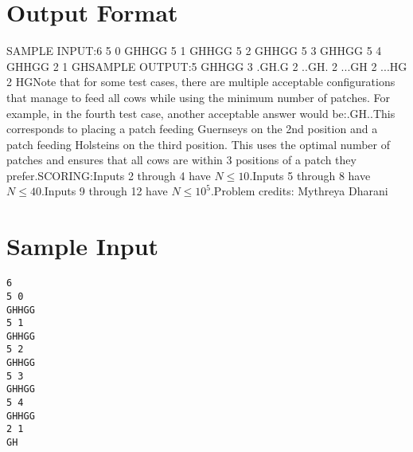 \documentclass[12pt]{article}
\begin{document}
\section*{Output Format}
SAMPLE INPUT:6
5 0
GHHGG
5 1
GHHGG
5 2
GHHGG
5 3
GHHGG
5 4
GHHGG
2 1
GHSAMPLE OUTPUT:5
GHHGG
3
.GH.G
2
..GH.
2
...GH
2
...HG
2
HGNote that for some test cases, there are multiple acceptable configurations that
manage to feed all cows while using the minimum number of patches. For example,
in the fourth test case, another acceptable answer would be:.GH..This corresponds to placing a patch feeding Guernseys on the 2nd position and a
patch feeding Holsteins on the third position. This uses the optimal number of
patches and ensures that all cows are within 3 positions of a patch they prefer.SCORING:Inputs 2 through 4 have $N \le 10$.Inputs 5 through 8 have $N \le 40$.Inputs 9 through 12 have $N \le 10^5$.Problem credits: Mythreya Dharani

\section*{Sample Input}
\begin{verbatim}
6
5 0
GHHGG
5 1
GHHGG
5 2
GHHGG
5 3
GHHGG
5 4
GHHGG
2 1
GH
\end{verbatim}
\end{document}
